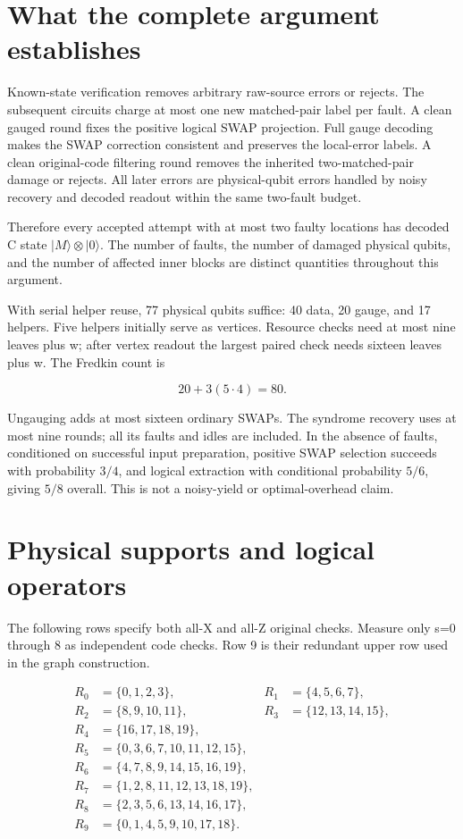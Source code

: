 \documentclass[11pt]{article}
\begin{document}
\section{What the complete argument establishes}
Known-state verification removes arbitrary raw-source errors or rejects. The subsequent circuits charge at most one new matched-pair label per fault. A clean gauged round fixes the positive logical SWAP projection. Full gauge decoding makes the SWAP correction consistent and preserves the local-error labels. A clean original-code filtering round removes the inherited two-matched-pair damage or rejects. All later errors are physical-qubit errors handled by noisy recovery and decoded readout within the same two-fault budget.

Therefore every accepted attempt with at most two faulty locations has decoded C state \(|M\rangle\otimes|0\rangle\). The number of faults, the number of damaged physical qubits, and the number of affected inner blocks are distinct quantities throughout this argument.

With serial helper reuse, 77 physical qubits suffice: 40 data, 20 gauge, and 17 helpers. Five helpers initially serve as vertices. Resource checks need at most nine leaves plus w; after vertex readout the largest paired check needs sixteen leaves plus w. The Fredkin count is

\[
20+3(5\cdot4)=80.
\]

Ungauging adds at most sixteen ordinary SWAPs. The syndrome recovery uses at most nine rounds; all its faults and idles are included. In the absence of faults, conditioned on successful input preparation, positive SWAP selection succeeds with probability \(3/4\), and logical extraction with conditional probability \(5/6\), giving \(5/8\) overall. This is not a noisy-yield or optimal-overhead claim.

\clearpage\appendix
{}\section{Physical supports and logical operators}
The following rows specify both all-X and all-Z original checks. Measure only s=0 through 8 as independent code checks. Row 9 is their redundant upper row used in the graph construction.

\[
\begin{aligned}
R_0&=\{0,1,2,3\},&R_1&=\{4,5,6,7\},\\
R_2&=\{8,9,10,11\},&R_3&=\{12,13,14,15\},\\
R_4&=\{16,17,18,19\},\\
R_5&=\{0,3,6,7,10,11,12,15\},\\
R_6&=\{4,7,8,9,14,15,16,19\},\\
R_7&=\{1,2,8,11,12,13,18,19\},\\
R_8&=\{2,3,5,6,13,14,16,17\},\\
R_9&=\{0,1,4,5,9,10,17,18\}.
\end{aligned}
\]
\end{document}
